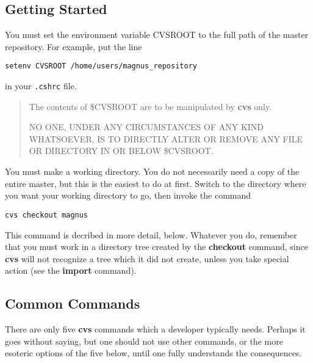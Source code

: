 \subsection{Getting Started}

You must set the environment variable CVSROOT to the full path of the
master repository. For example, put the line

\vspace{8pt}

{\tt setenv CVSROOT /home/users/magnus\_repository}

\vspace{8pt}

\noindent in your {\tt .cshrc} file.

\vspace{8pt}

\begin{quotation}

The contents of \$CVSROOT are to be manipulated by {\bf cvs} only.

NO ONE, UNDER ANY CIRCUMSTANCES OF ANY KIND WHATSOEVER, IS TO DIRECTLY
ALTER OR REMOVE ANY FILE OR DIRECTORY IN OR BELOW \$CVSROOT.

\end{quotation}


You must make a working directory. You do not necessarily need a copy
of the entire master, but this is the easiest to do at first.  Switch
to the directory where you want your working directory to go, then
invoke the command

\vspace{8pt}

{\tt cvs checkout magnus}

\vspace{8pt}

This command is decribed in more detail, below. Whatever you do,
remember that you must work in a directory tree created by the {\bf
checkout} command, since {\bf cvs} will not recognize a tree which it
did not create, unless you take special action (see the {\bf import}
command).


\subsection{Common Commands}

There are only five {\bf cvs} commands which a developer typically
needs. Perhaps it goes without saying, but one should not use other
commands, or the more esoteric options of the five below, until one
fully understands the consequences.

